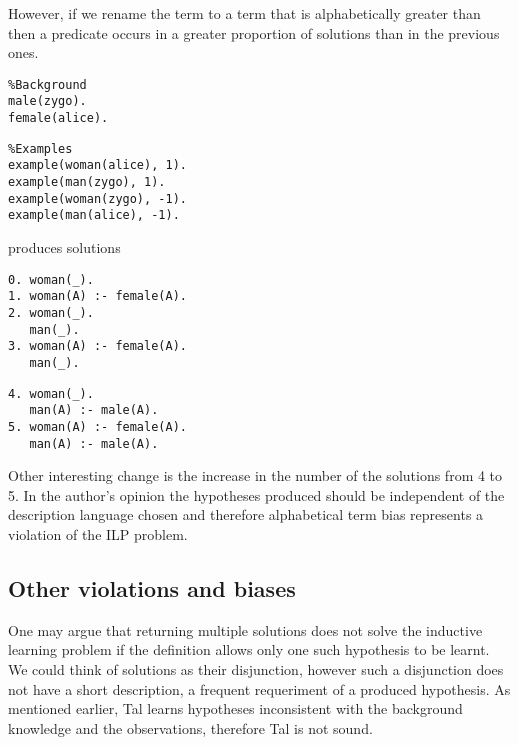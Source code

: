 However, if we rename the term  to a term that is alphabetically greater than  then a predicate  occurs in a greater proportion of solutions than in the previous ones.

\begin{minipage}[t]{.50\textwidth}
\begin{lstlisting}
%Background
male(zygo).
female(alice).
\end{lstlisting}
\end{minipage}
\begin{minipage}[t]{.20\textwidth}
\begin{lstlisting}
%Examples
example(woman(alice), 1).
example(man(zygo), 1).
example(woman(zygo), -1).
example(man(alice), -1).
\end{lstlisting}
\end{minipage}

produces solutions

\begin{minipage}[t]{.50\textwidth}
\begin{lstlisting}
0. woman(_).
1. woman(A) :- female(A).
2. woman(_).
   man(_).
3. woman(A) :- female(A).
   man(_).
\end{lstlisting}
\end{minipage}
\begin{minipage}[t]{.20\textwidth}
\begin{lstlisting}
4. woman(_).
   man(A) :- male(A).
5. woman(A) :- female(A).
   man(A) :- male(A).
\end{lstlisting}
\end{minipage}

Other interesting change is the increase in the number of the solutions from 4 to 5. In the author's opinion the hypotheses produced should be independent of the description language chosen and therefore alphabetical term bias represents a violation of the ILP problem.

\subsection{Other violations and biases}
One may argue that returning multiple solutions does not solve the inductive learning problem if the definition allows only one such hypothesis to be learnt. We could think of solutions as their disjunction, however such a disjunction does not have a short description, a frequent requeriment of a produced hypothesis. As mentioned earlier, Tal learns hypotheses inconsistent with the background knowledge and the observations, therefore Tal is not sound.

